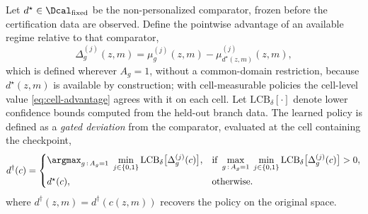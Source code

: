 Let $d^\star\in\Dcal_{\mathrm{fixed}}$ be the non-personalized comparator, frozen
before the certification data are observed.  Define the pointwise advantage of
an available regime relative to that comparator,
\begin{equation}
 \Delta^{(j)}_g(z,m)=\mu^{(j)}_g(z,m)-\mu^{(j)}_{d^\star(z,m)}(z,m),
 \label{eq:pointwise-advantage}
\end{equation}
which is defined wherever $A_g=1$, without a common-domain restriction, because
$d^\star(z,m)$ is available by construction; with cell-measurable policies the
cell-level value \eqref{eq:cell-advantage} agrees with it on each cell.  Let
$\mathrm{LCB}_\delta[\cdot]$ denote lower confidence bounds computed from the
held-out branch data.  The learned policy is defined as a \emph{gated deviation}
from the comparator, evaluated at the cell containing the checkpoint,
\begin{equation}
 d^\dagger(c)=
 \begin{cases}
  \displaystyle\argmax_{g\,:\,A_g=1}\;\min_{j\in\{0,1\}}\mathrm{LCB}_\delta\big[\Delta^{(j)}_g(c)\big],
   & \text{if }\displaystyle\max_{g\,:\,A_g=1}\;\min_{j\in\{0,1\}}\mathrm{LCB}_\delta\big[\Delta^{(j)}_g(c)\big]>0,\\[2ex]
  d^\star(c), & \text{otherwise.}
 \end{cases}
 \label{eq:gated-rule}
\end{equation}
where $d^\dagger(z,m)=d^\dagger(c(z,m))$ recovers the policy on the original
space.


